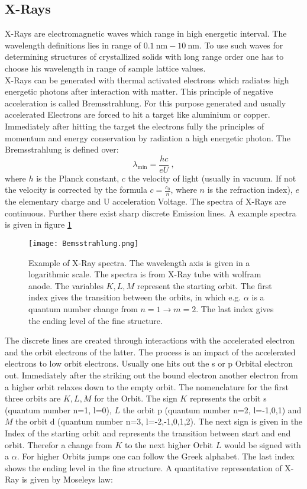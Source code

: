 \subsection{X-Rays}
	X-Rays are electromagnetic waves which range in high energetic interval. The wavelength definitions lies in range of $\SI{0.1}{\nano\metre}-\SI{10}{\nano\metre}$. To use such waves for determining structures of crystallized solids with long range order one has to choose his wavelength in range of sample lattice values.\\
	X-Rays can be generated with thermal activated electrons which radiates high energetic photons after interaction with matter. This principle of negative acceleration is called Bremsstrahlung. For this purpose generated and usually accelerated Electrons are forced to hit a target like aluminium or copper. Immediately after hitting the target the electrons fully the principles of momentum and energy conservation by radiation a high energetic photon. The Bremsstrahlung is defined over:
	\begin{equation}
		\lambda_\text{min}=\frac{hc}{eU}~\mathrm{,}
	\end{equation}
	where $h$ is the Planck constant, $c$ the velocity of light (usually in vacuum. If not the velocity is corrected by the formula  $c=\frac{c_0}{n}$, where $n$ is the refraction index), $e$ the elementary charge and U acceleration Voltage. 
	The spectra of X-Rays are continuous. Further there exist sharp discrete Emission lines. A example spectra is given in figure \ref{Bremsspektrum}
	\begin{figure}[h]
		\centering
		\texttt{[image: Bemsstrahlung.png]}
		\caption[Example of X-Ray spectra]{Example of X-Ray spectra. The wavelength axis is given in a logarithmic scale. The spectra is from X-Ray tube with wolfram anode. The variables $K,L,M$ represent the starting orbit. The first index gives the transition between the orbits, in which e.g. $\alpha$ is a quantum number change from $n=1\to m=2$. The last index gives the ending level of the fine structure. \cite{lit:GroMa14}}
		\label{Bremsspektrum}
	\end{figure}
	The discrete lines are created through interactions with the accelerated electron and the orbit electrons of the latter. The process is an impact of the accelerated electrons to low orbit electrons. Usually one hits out the s or p Orbital electron out. Immediately after the striking out the bound electron another electron from a higher orbit relaxes down to the empty orbit. The nomenclature for the first three orbits are $K, L, M$ for the Orbit. The sign $K$ represents the orbit s (quantum number n=1, l=0), $L$ the orbit p (quantum number n=2, l=-1,0,1) and $M$ the orbit d (quantum number n=3, l=-2,-1,0,1,2). The next sign is given in the Index of the starting orbit and represents the transition between start and end orbit. Therefor a change from $K$ to the next higher Orbit $L$ would be signed with a $\alpha$. For higher Orbits jumps one can follow the Greek alphabet. The last index shows the ending level in the fine structure. A quantitative representation of X-Ray is given by Moseleys law:
